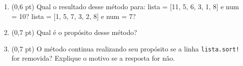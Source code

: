 \documentclass[a4paper,10pt]{article}
\begin{document}
\begin{multicols*}{2}
\begin{enumerate}
  \begin{enumerate}
    \item (0,6 pt) Qual o resultado desse método para: lista = [11, 5, 6, 3, 1, 8] e num = 10? lista = [1, 5, 7, 3, 2, 8] e num = 7? %
    \item (0,7 pt) Qual é o propósito desse método? %
    \item (0,7 pt) O método continua realizando seu propósito se a linha \texttt{lista.sort!} for removida? Explique o motivo se a resposta for não. %
  \end{enumerate}
\end{enumerate}
\end{multicols*}
\end{document}
